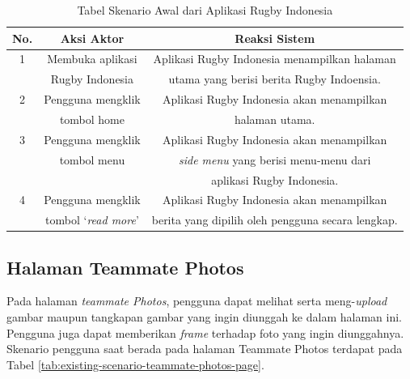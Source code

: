 \begin{table} [!h]
    \centering
    \caption{Tabel Skenario Awal dari Aplikasi Rugby Indonesia}
    \begin{tabular}{|c|c|c|}
    \hline
       No. & Aksi Aktor & Reaksi Sistem  \\ \hline
        1 & Membuka aplikasi & Aplikasi Rugby Indonesia menampilkan halaman \\
         & Rugby Indonesia & utama yang berisi berita Rugby Indoensia. \\ \hline
        2 & Pengguna mengklik & Aplikasi Rugby Indonesia akan menampilkan \\ 
         & tombol home &  halaman utama. \\ \hline
        3 & Pengguna mengklik & Aplikasi Rugby Indonesia akan menampilkan \\ 
         & tombol menu &  \textit{side menu} yang berisi menu-menu dari \\ 
         & &  aplikasi Rugby Indonesia. \\ \hline
        4 & Pengguna mengklik & Aplikasi Rugby Indonesia akan menampilkan \\
          & tombol `\textit{read more}' & berita yang dipilih oleh pengguna secara lengkap. \\ \hline
    \end{tabular}
    \label{tab:existing-scenario-welcome-page}
\end{table}

\subsection{Halaman Teammate Photos}

Pada halaman \textit{teammate Photos}, pengguna dapat melihat serta meng-\textit{upload} gambar maupun tangkapan gambar yang ingin diunggah ke dalam halaman ini. Pengguna juga dapat memberikan \textit{frame} terhadap foto yang ingin diunggahnya. Skenario pengguna saat berada pada halaman Teammate Photos terdapat pada Tabel \ref{tab:existing-scenario-teammate-photos-page}.

